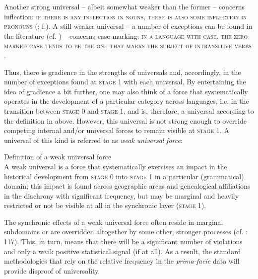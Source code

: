 \documentclass[output=paper]{langsci/langscibook}
\begin{document}
Another strong universal – albeit somewhat weaker than the former – concerns inflection: \textsc{if there is any inflection in nouns, there is also some inflection in pronouns} (\citealt{Moravcsik1993}; \citealt{PlankEtAl2002f}f.). A still weaker universal – a number of exceptions can be found in the literature (cf. \citealt{Handschuh2014}) – concerns case marking: \textsc{in a language with case, the zero-marked case tends to be the one that marks the subject of intransitive verbs} \citep[95]{Greenberg1963}. 

Thus, there is gradience in the strengths of universals and, accordingly, in the number of exceptions found at \textsc{stage 1} with each universal. By entertaining the idea of gradience a bit further, one may also think of a force that systematically operates in the development of a particular category across languages, i.e. in the transition between \textsc{stage} 0 and \textsc{stage} 1, and is, therefore, a universal according to the definition in  above. However, this universal is not strong enough to override competing internal and/or universal forces to remain visible at \textsc{stage} 1. A universal of this kind is referred to as \textit{weak} \textit{universal} \textit{force}\textsc{:} 

\ea
Definition of a weak universal force\\
A weak universal is a force that systematically exercises an impact in the historical development from \textsc{stage 0} into \textsc{stage 1} in a particular (grammatical) domain; this impact is found across geographic areas and genealogical affiliations in the diachrony with significant frequency, but may be marginal and heavily restricted or not be visible at all in the synchronic layer (\textsc{stage 1}).
\z

The synchronic effects of a weak universal force often reside in marginal subdomains or are overridden altogether by some other, stronger processes (cf. \citealt{Bickel2014}: 117). This, in turn, means that there will be a significant number of violations and only a weak positive statistical signal (if at all). As a result, the standard methodologies that rely on the relative frequency in the \textit{prima-facie} data will provide disproof of universality. 
\end{document}
